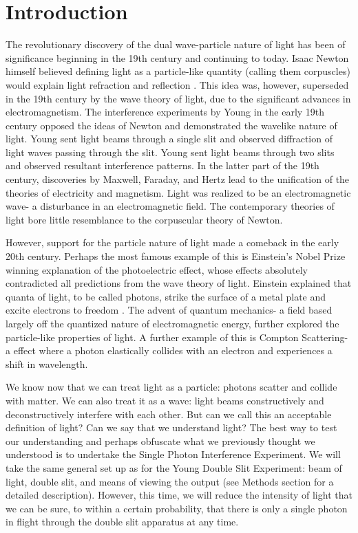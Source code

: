 \documentclass[prb,preprint]{revtex4-1}
\begin{document}
\section{Introduction} %

The revolutionary discovery of the dual wave-particle nature of light has been of significance beginning in the 19th century and continuing to today.  Isaac Newton himself believed defining light as a particle-like quantity (calling them corpuscles) would explain light refraction and reflection \cite{newton}.  This idea was, however, superseded in the 19th century by the wave theory of light, due to the significant advances in electromagnetism.  The interference experiments by Young in the early 19th century opposed the ideas of Newton and demonstrated the wavelike nature of light.  Young sent light beams through a single slit and observed diffraction of light waves passing through the slit.  Young sent light beams through two slits and observed resultant interference patterns.  In the latter part of the 19th century, discoveries by Maxwell, Faraday, and Hertz lead to the unification of the theories of electricity and magnetism.  Light was realized to be an electromagnetic wave- a disturbance in an electromagnetic field.  The contemporary theories of light bore little resemblance to the corpuscular theory of Newton.  \cite{david}

However, support for the particle nature of light made a comeback in the early 20th century.  Perhaps the most famous example of this is Einstein's Nobel Prize winning explanation of the photoelectric effect, whose effects absolutely contradicted all predictions from the wave theory of light.  Einstein explained that quanta of light, to be called photons, strike the surface of a metal plate and excite electrons to freedom \cite{modern}.  The advent of quantum mechanics- a field based largely off the quantized nature of electromagnetic energy, further explored the particle-like properties of light.  A further example of this is Compton Scattering- a effect where a photon elastically collides with an electron and experiences a shift in wavelength.  

We know now that we can treat light as a particle: photons scatter and collide with matter.  We can also treat it as a wave: light beams constructively and deconstructively interfere with each other.  But can we call this an acceptable definition of light?  Can we say that we understand light?  The best way to test our understanding and perhaps obfuscate what we previously thought we understood is to undertake the Single Photon Interference Experiment.  We will take the same general set up as for the Young Double Slit Experiment:  beam of light, double slit, and means of viewing the output (see Methods section for a detailed description).  However, this time, we will reduce the intensity of light that we can be sure, to within a certain probability, that there is only a single photon in flight through the double slit apparatus at any time. \cite{teachspin}
\end{document}
